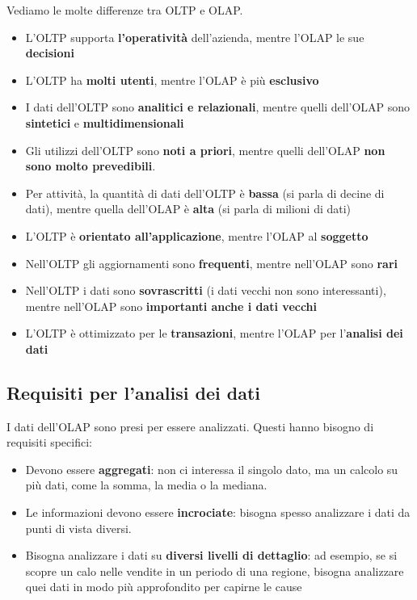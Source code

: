 \documentclass[11pt, a4paper, titlepage, oneside]{scrbook}
\begin{document}
Vediamo le molte differenze tra OLTP e OLAP.
\begin{itemize}
    \item L'OLTP supporta \textbf{l'operatività} dell'azienda, mentre l'OLAP le sue \textbf{decisioni}
    \item L'OLTP ha \textbf{molti utenti}, mentre l'OLAP è più \textbf{esclusivo}
    \item I dati dell'OLTP sono \textbf{analitici e relazionali}, mentre quelli dell'OLAP sono \textbf{sintetici} e \textbf{multidimensionali}
    \item Gli utilizzi dell'OLTP sono \textbf{noti a priori}, mentre quelli dell'OLAP \textbf{non sono molto prevedibili}.
    \item Per attività, la quantità di dati dell'OLTP è \textbf{bassa} (si parla di decine di dati), mentre quella dell'OLAP è \textbf{alta} (si parla di milioni di dati)
    \item L'OLTP è \textbf{orientato all'applicazione}, mentre l'OLAP al \textbf{soggetto}
    \item Nell'OLTP gli aggiornamenti sono \textbf{frequenti}, mentre nell'OLAP sono \textbf{rari}
    \item Nell'OLTP i dati sono \textbf{sovrascritti} (i dati vecchi non sono interessanti), mentre nell'OLAP sono \textbf{importanti anche i dati vecchi}
    \item L'OLTP è ottimizzato per le \textbf{transazioni}, mentre l'OLAP per l'\textbf{analisi dei dati}
\end{itemize}

\subsection{Requisiti per l'analisi dei dati}

I dati dell'OLAP sono presi per essere analizzati. Questi hanno bisogno di requisiti specifici:
\begin{itemize}
    \item Devono essere \textbf{aggregati}: non ci interessa il singolo dato, ma un calcolo su più dati, come la somma, la media o la mediana.
    \item Le informazioni devono essere \textbf{incrociate}: bisogna spesso analizzare i dati da punti di vista diversi.
    \item Bisogna analizzare i dati su \textbf{diversi livelli di dettaglio}: ad esempio, se si scopre un calo nelle vendite in un periodo di una regione, bisogna analizzare quei dati in modo più approfondito per capirne le cause 
\end{itemize}
\end{document}
